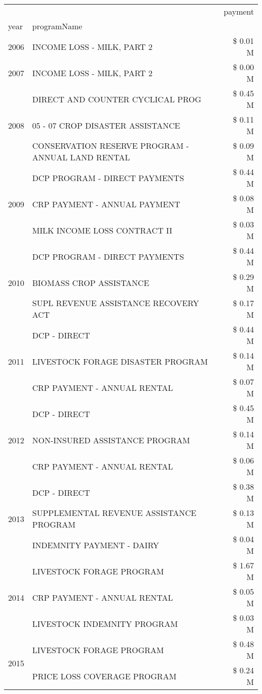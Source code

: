 \begin{tabular}{llr}
\toprule
 &  & payment \\
year & programName &  \\
\midrule
2006 & INCOME LOSS - MILK, PART 2 & \$ 0.01 M \\
\cline{1-3}
2007 & INCOME LOSS - MILK, PART 2 & \$ 0.00 M \\
\cline{1-3}
\multirow[t]{3}{*}{2008} & DIRECT AND COUNTER CYCLICAL PROG & \$ 0.45 M \\
 & 05 - 07 CROP DISASTER ASSISTANCE & \$ 0.11 M \\
 & CONSERVATION RESERVE PROGRAM - ANNUAL LAND RENTAL & \$ 0.09 M \\
\cline{1-3}
\multirow[t]{3}{*}{2009} & DCP PROGRAM - DIRECT PAYMENTS & \$ 0.44 M \\
 & CRP PAYMENT - ANNUAL PAYMENT & \$ 0.08 M \\
 & MILK INCOME LOSS CONTRACT II & \$ 0.03 M \\
\cline{1-3}
\multirow[t]{3}{*}{2010} & DCP PROGRAM - DIRECT PAYMENTS & \$ 0.44 M \\
 & BIOMASS CROP ASSISTANCE & \$ 0.29 M \\
 & SUPL REVENUE ASSISTANCE RECOVERY ACT & \$ 0.17 M \\
\cline{1-3}
\multirow[t]{3}{*}{2011} & DCP - DIRECT & \$ 0.44 M \\
 & LIVESTOCK FORAGE DISASTER PROGRAM & \$ 0.14 M \\
 & CRP PAYMENT - ANNUAL RENTAL & \$ 0.07 M \\
\cline{1-3}
\multirow[t]{3}{*}{2012} & DCP - DIRECT & \$ 0.45 M \\
 & NON-INSURED ASSISTANCE PROGRAM & \$ 0.14 M \\
 & CRP PAYMENT - ANNUAL RENTAL & \$ 0.06 M \\
\cline{1-3}
\multirow[t]{3}{*}{2013} & DCP - DIRECT & \$ 0.38 M \\
 & SUPPLEMENTAL REVENUE ASSISTANCE PROGRAM & \$ 0.13 M \\
 & INDEMNITY PAYMENT - DAIRY & \$ 0.04 M \\
\cline{1-3}
\multirow[t]{3}{*}{2014} & LIVESTOCK FORAGE PROGRAM & \$ 1.67 M \\
 & CRP PAYMENT - ANNUAL RENTAL & \$ 0.05 M \\
 & LIVESTOCK INDEMNITY PROGRAM & \$ 0.03 M \\
\cline{1-3}
\multirow[t]{3}{*}{2015} & LIVESTOCK FORAGE PROGRAM & \$ 0.48 M \\
 & PRICE LOSS COVERAGE PROGRAM & \$ 0.24 M \\

\end{tabular}
